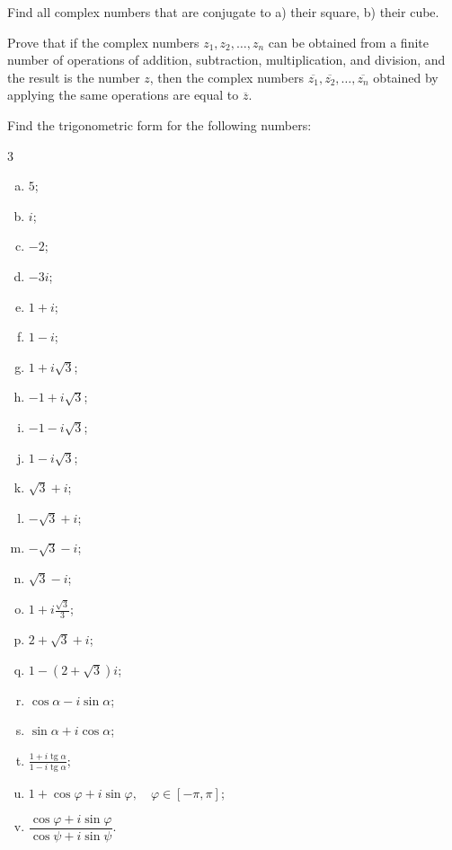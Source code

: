 \begin{problem}
Find all complex numbers that are conjugate to a) their square, b) their cube.
\end{problem}

\begin{problem}
Prove that if the complex numbers $z_1, z_2, \ldots, z_n$ can be obtained from a finite number of operations of addition, subtraction, multiplication, and division, and the result is the number $z$, then the complex numbers $\overline{z_1}, \overline{z_2}, \ldots, \overline{z_n}$ obtained by applying the same operations are equal to $\overline{z}$.
\end{problem}

\begin{problem}
Find the trigonometric form for the following numbers:
\begin{multicols}{3}
\begin{enumerate}[a)]
\item $5$;
\item $i$;
\item $-2$;
\item $-3i$;
\item $1+i$;
\item $1-i$;
\item $1+i\sqrt{3}$;
\item $-1+i\sqrt{3}$;
\item $-1-i\sqrt{3}$;
\item $1-i\sqrt{3}$;
\item $\sqrt{3}+i$;
\item $-\sqrt{3}+i$;
\item $-\sqrt{3}-i$;
\item $\sqrt{3}-i$;
\item $1+i\frac{\sqrt{3}}{3}$;
\item $2+\sqrt{3}+i$;
\item $1-(2+\sqrt{3})i$;
\item $\cos \alpha - i \sin \alpha$;
\item $\sin \alpha + i \cos \alpha$;
\item $\frac{1+i \operatorname{tg} \alpha}{1-i \operatorname{tg} \alpha}$;
\item $1+\cos \varphi + i \sin \varphi,\quad \varphi \in [-\pi, \pi]$;
\item $\dfrac{\cos \varphi + i \sin \varphi}{\cos \psi + i \sin \psi}$.
\end{enumerate}
\end{multicols}
\end{problem}

